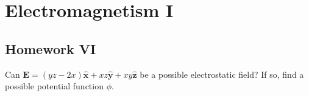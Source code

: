 \documentclass[crop=false,class=article,oneside]{standalone}
\begin{document}
    \ifx\ifphysicscourseselectromagnetismI\undefined
        \section*{Electromagnetism I}
        \setcounter{section}{6}
        \renewcommand\thefigure{%
            \arabic{section}.\arabic{figure}%
        }
        \renewcommand\thesubfigure{%
            \arabic{section}.\arabic{figure}.\arabic{subfigure}%
        }
    \fi
    \subsection{Homework VI}
    \begin{problem}[Wangsness 5-1]
        Can
        $\mathbf{E}%
         =(yz-2x)\hat{\mathbf{x}}%
         +xz\hat{\mathbf{y}}%
         +xy\hat{\mathbf{z}}$
        be a possible electrostatic field? If so,
        find a possible potential function $\phi$.
    \end{problem}
\end{document}
